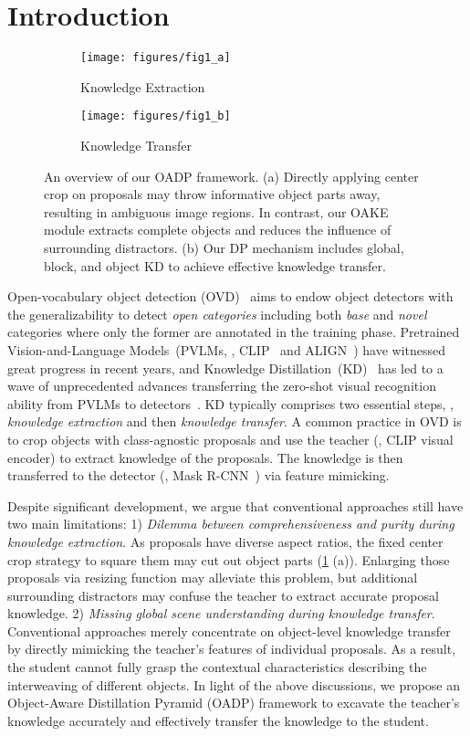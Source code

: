 \documentclass[10pt,twocolumn,letterpaper]{article}
\def\OADP{Object-Aware Distillation Pyramid}
\begin{document}
\section{Introduction}

\begin{figure}[t]
  \centering
  \begin{subfigure}{0.8\linewidth}
    \texttt{[image: figures/fig1\_a]}
    \caption{Knowledge Extraction}
  \end{subfigure}
  \begin{subfigure}{0.8\linewidth}
    \texttt{[image: figures/fig1\_b]}
    \caption{Knowledge Transfer}
  \end{subfigure}
  \caption{
    An overview of our OADP framework.
    (a) Directly applying center crop on proposals may throw informative object parts away, resulting in ambiguous image regions.
    In contrast, our OAKE module extracts complete objects and reduces the influence of surrounding distractors.
    (b) Our DP mechanism includes global, block, and object KD to achieve effective knowledge transfer.
  }
  \label{fig:fig1}
\end{figure}

Open-vocabulary object detection (OVD)~\cite{ovr_cnn} aims to endow object detectors with the generalizability to detect \textit{open categories} including both \textit{base} and \textit{novel} categories where only the former are annotated in the training phase.
Pretrained Vision-and-Language Models~(PVLMs, \eg, CLIP~\cite{clip} and ALIGN~\cite{align}) have witnessed great progress in recent years, and Knowledge Distillation~(KD)~\cite{kd} has led to a wave of unprecedented advances transferring the zero-shot visual recognition ability from PVLMs to detectors~\cite{vild, hierkd, owl_vit, ov_detr, regionclip, gen_vlkt}.
KD typically comprises two essential steps, \ie, \textit{knowledge extraction} and then \textit{knowledge transfer}.
A common practice in OVD is to crop objects with class-agnostic proposals and use the teacher (\eg, CLIP visual encoder) to extract knowledge of the proposals.
The knowledge is then transferred to the detector (\eg, Mask R-CNN~\cite{mask_rcnn}) via feature mimicking.

Despite significant development, we argue that conventional approaches still have two main limitations:
1) \textit{Dilemma between comprehensiveness and purity during knowledge extraction}.
As proposals have diverse aspect ratios, the fixed center crop strategy to square them may cut out object parts (\cref{fig:fig1} (a)).
Enlarging those proposals via resizing function may alleviate this problem, but additional surrounding distractors may confuse the teacher to extract accurate proposal knowledge.
2) \textit{Missing global scene understanding during knowledge transfer}.
Conventional approaches merely concentrate on object-level knowledge transfer by directly mimicking the teacher's features of individual proposals.
As a result, the student cannot fully grasp the contextual characteristics  describing the interweaving of different objects.
In light of the above discussions, we propose an \OADP{} (OADP) framework to excavate the teacher's knowledge accurately and effectively transfer the knowledge to the student.
\end{document}
